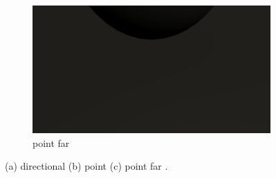 \begin{figure}
\begin{subfigure}[t]{0.33\textwidth}
\centering
\includegraphics[width=\linewidth]{figures/shadows/point-far-cleaned}
\caption{point far}
\label{fig:point-far}
\end{subfigure}%

\caption{
(a) directional
(b) point
(c) point far
.}
\label{fig:rest-analysis}
\end{figure}


